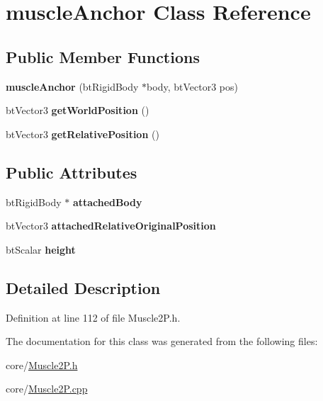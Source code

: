 \hypertarget{classmuscle_anchor}{\section{muscle\-Anchor Class Reference}
\label{classmuscle_anchor}
}
\subsection*{Public Member Functions}
\begin{DoxyCompactItemize}
\item 
\hypertarget{classmuscle_anchor_a88f92d4d74813604c590dbfb05248f1d}{{\bfseries muscle\-Anchor} (bt\-Rigid\-Body $\ast$body, bt\-Vector3 pos)}\label{classmuscle_anchor_a88f92d4d74813604c590dbfb05248f1d}

\item 
\hypertarget{classmuscle_anchor_a98b3e1b3219cbb1ee8150fb8c9b5df1f}{bt\-Vector3 {\bfseries get\-World\-Position} ()}\label{classmuscle_anchor_a98b3e1b3219cbb1ee8150fb8c9b5df1f}

\item 
\hypertarget{classmuscle_anchor_a3181f719d3b1057282b081abddaba257}{bt\-Vector3 {\bfseries get\-Relative\-Position} ()}\label{classmuscle_anchor_a3181f719d3b1057282b081abddaba257}

\end{DoxyCompactItemize}
\subsection*{Public Attributes}
\begin{DoxyCompactItemize}
\item 
\hypertarget{classmuscle_anchor_a88b682152dfaf3dde4a940bdd8fbe113}{bt\-Rigid\-Body $\ast$ {\bfseries attached\-Body}}\label{classmuscle_anchor_a88b682152dfaf3dde4a940bdd8fbe113}

\item 
\hypertarget{classmuscle_anchor_a8557dc6276d192bafbf2666ed224ebdf}{bt\-Vector3 {\bfseries attached\-Relative\-Original\-Position}}\label{classmuscle_anchor_a8557dc6276d192bafbf2666ed224ebdf}

\item 
\hypertarget{classmuscle_anchor_a9cbb94d064816e0d8b225051eff891a8}{bt\-Scalar {\bfseries height}}\label{classmuscle_anchor_a9cbb94d064816e0d8b225051eff891a8}

\end{DoxyCompactItemize}


\subsection{Detailed Description}


Definition at line 112 of file Muscle2\-P.\-h.



The documentation for this class was generated from the following files\-:\begin{DoxyCompactItemize}
\item 
core/\hyperlink{_muscle2_p_8h}{Muscle2\-P.\-h}\item 
core/\hyperlink{_muscle2_p_8cpp}{Muscle2\-P.\-cpp}\end{DoxyCompactItemize}
